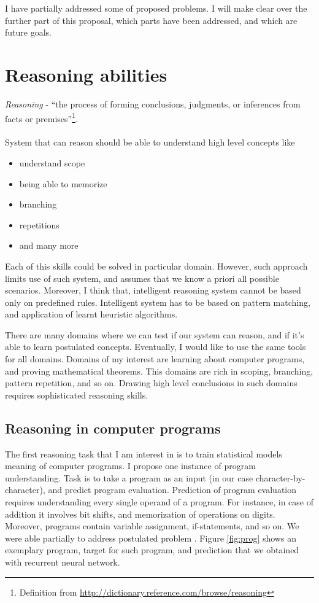 \documentclass{article}
\begin{document}
I have partially addressed some of proposed problems. I will make clear over the further part of this proposal, 
which parts have been addressed, and which are future goals.



\section{Reasoning abilities}

\textit{Reasoning} - ``the process of forming conclusions, judgments, or inferences from facts or 
premises''\footnote{Definition from \url{http://dictionary.reference.com/browse/reasoning}}.
\\
\\
System that can reason should be able to understand high level concepts like 
\begin{itemize}
 \item understand scope
 \item being able to memorize 
 \item branching
 \item repetitions
 \item and many more
\end{itemize}
Each of this skills could be solved in particular domain. However, such approach limits use of such system,
and assumes that we know a priori all possible scenarios. 
Moreover, I think that, intelligent reasoning system cannot be based only on predefined rules. 
Intelligent system has to be based on pattern matching, and application of learnt heuristic algorithms. 


There are many domains where we can test if our system can reason, and if it's able to learn postulated concepts. Eventually,
I would like to use the same tools for all domains. 
Domains of my interest are learning about computer programs, and 
proving mathematical theorems.
This domains are rich in scoping, branching, pattern repetition, and so on. Drawing
high level conclusions in such domains requires sophisticated reasoning skills.

\subsection{Reasoning in computer programs}
The first reasoning task that I am interest in is to train statistical models meaning of computer programs.
I propose one instance of program understanding.
Task is to take a program as an input (in our case character-by-character), and predict program evaluation. 
Prediction of program evaluation requires understanding every single operand of a program. For instance, in case of
addition it 
involves bit shifts, and memorization of operations on digits. Moreover, programs contain variable assignment, if-statements, and so on.
We were able partially to address postulated problem
\cite{zaremba2014execute}.
Figure \ref{fig:prog} shows
an exemplary program, target for such program, and prediction that we obtained with recurrent neural network.
\end{document}
